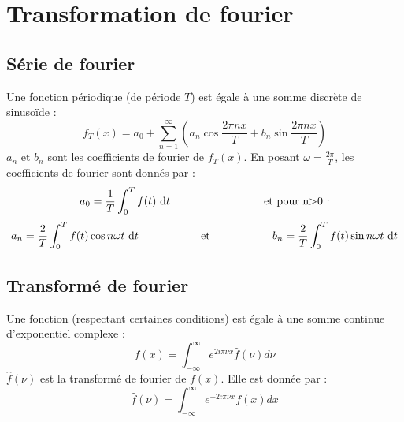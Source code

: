 
\chapter{Transformation de fourier}

\section{Série de fourier}
Une fonction périodique (de période $T$) est égale à une somme discrète de sinusoïde :
\[
f_T(x)=a_0 + \sum_{n=1}^\infty \left( a_n \cos \frac{2 \pi n x}{T} + b_n \sin \frac{2 \pi n x}{T} \right)
\]
$a_n$ et $b_n$ sont les coefficients de fourier de $f_T(x)$.
En posant $\omega=\frac{2\pi}{T}$,
les coefficients de fourier sont donnés par :
\[
a_0=\frac{1}{T}\int_0^Tf(t)\mt{ d}t \hspace{3cm} \mt{et pour n>0 :}
\]
\[
a_n=\frac{2}{T}\int_0^Tf(t)\cos n \omega t\text{ d}t \hspace{2cm} \text{et} \hspace{2cm} b_n=\frac{2}{T}\int_0^Tf(t)\sin n \omega t\text{ d}t
\]
\section{Transformé de fourier}
Une fonction (respectant certaines conditions) est égale à une somme continue d'exponentiel complexe :
\[
f(x) = \int_{-\infty}^\infty e^{2 i \pi \nu x}\widehat{f}(\nu) d\nu
\]
$\widehat{f}(\nu)$ est la transformé de fourier de $f(x)$. Elle est donnée par :
\[
\widehat{f}(\nu) = \int_{-\infty}^\infty e^{-2 i \pi \nu x}f(x) dx
\]
